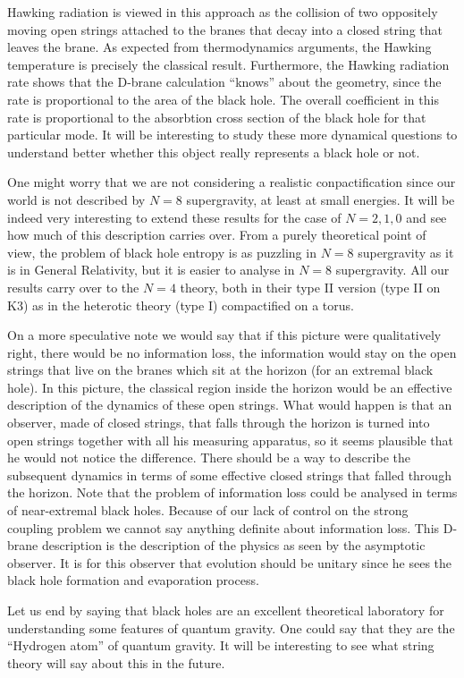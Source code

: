 Hawking radiation is viewed in this approach as
the collision of two oppositely moving open strings
attached to the branes that decay into a closed string that
leaves the brane. As expected from thermodynamics arguments,
the Hawking temperature is precisely the classical 
result. Furthermore, the Hawking radiation rate shows 
that the D-brane calculation ``knows'' about the geometry, since
the rate is proportional to the area of the black hole. 
The overall coefficient in this rate is proportional to 
the absorbtion cross section of the  black hole for that particular
mode. 
It will be interesting to study 
these more dynamical questions to understand better whether this
object really represents a black hole or not.


One might worry that we are not  considering a 
realistic conpactification since our world is not
 described by $N=8$ supergravity, at least 
at small energies. It will be indeed very interesting 
to extend these results for the case of $N=2,1,0$ and see
how much of this description carries over.
From a purely theoretical point of view, the 
problem of black hole entropy is  as puzzling in 
$N=8$ supergravity as it is in General Relativity, 
but it is easier to analyse in $N=8$ supergravity.
All our results carry over to the $N=4$ theory, both in
their type II version (type II on K3) as in the 
heterotic theory (type I) compactified on a torus. 

On a more speculative note  we would say that 
if this picture were qualitatively right, there would be no 
information loss, the information would stay  on the open strings
that live on the branes which sit at the horizon (for an extremal 
black hole). In this
picture, the classical region inside the horizon would be
an effective description of the dynamics of these open strings.
What would happen is that an observer, made of closed 
strings,   that 
falls through the horizon  is turned into open strings 
together with all his measuring apparatus, so it seems plausible
that he would not notice the difference. There should be 
a way to describe the subsequent dynamics in terms of
some effective closed strings that falled through the horizon. 
 Note that
the problem of information loss could be analysed in 
terms of near-extremal black holes. 
Because of our lack of control on the strong coupling
problem we cannot say anything definite about information
loss.
This D-brane description is the description of the physics as 
seen by the asymptotic  observer. It is for this observer that
evolution should be unitary since he sees the black hole formation
and evaporation process. 


Let us end by saying that black holes are an excellent theoretical 
laboratory
for understanding some features of quantum gravity. One could say that
they are the ``Hydrogen atom'' of quantum gravity. 
It will be interesting to see what  string theory  will say about
this in the future. 


\vfill\eject
 

\listrefs




\bye

